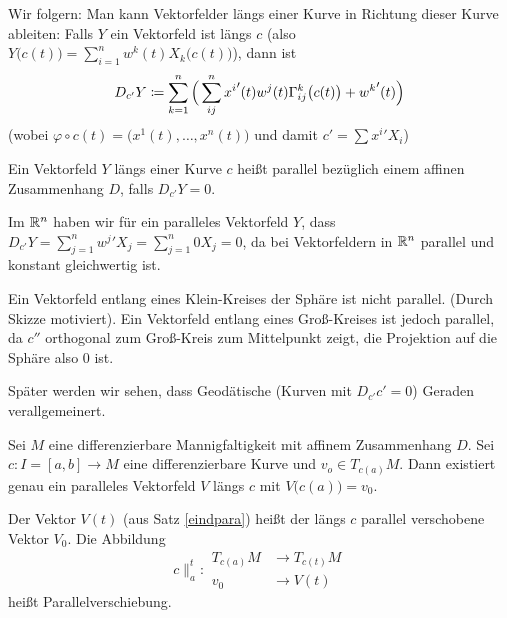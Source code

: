 \documentclass[a4paper,twoside,DIV15,BCOR12mm]{scrbook}
\begin{document}
Wir folgern: Man kann Vektorfelder längs einer Kurve in Richtung dieser Kurve ableiten: Falls $Y$ ein Vektorfeld ist längs $c$ (also $Y\big(c(t)\big) = \sum_{i=1}^n w^k(t)X_k\big(c(t)\big)$), dann ist
\[
D_{c'}Y \da \sum_{k=1}^n\Big(\sum_{ij}^n {x^i}'(t) w^j(t) \Gamma_{ij}^k\big(c(t)\big) + {w^k}'(t)\Big)
\]
(wobei $\varphi \circ c(t) = \big(x^1(t),\ldots, x^n(t)\big)$ und damit $c' = \sum {x^i}'X_i$)

\begin{definition}
Ein Vektorfeld $Y$ längs einer Kurve $c$ heißt parallel bezüglich einem affinen Zusammenhang $D$, falls $D_{c'}Y = 0$.
\end{definition}

\begin{beispiele}
\item Im $\mathbb{R}^n$ haben wir für ein paralleles Vektorfeld $Y$, dass $D_{c'}Y = \sum_{j=1}^n {w^j}'X_j = \sum_{j=1}^n 0 X_j= 0$, da bei Vektorfeldern in $\mathbb{R}^n$ parallel und konstant gleichwertig ist.
\item Ein Vektorfeld entlang eines Klein-Kreises der Sphäre ist nicht parallel. (Durch Skizze motiviert). Ein Vektorfeld entlang eines Groß-Kreises ist jedoch parallel, da $c''$ orthogonal zum Groß-Kreis zum Mittelpunkt zeigt, die Projektion auf die Sphäre also 0 ist.
\end{beispiele}

Später werden wir sehen, dass Geodätische (Kurven mit $D_{c'}c' = 0$) Geraden verallgemeinert.

\begin{satz}
\label{eindpara}
Sei $M$ eine differenzierbare Mannigfaltigkeit mit affinem Zusammenhang $D$. Sei $c: I=[a,b] \to M$ eine differenzierbare Kurve und $v_o \in T_{c(a)}M$. Dann existiert genau ein paralleles Vektorfeld $V$ längs $c$ mit $V\big(c(a)\big)= v_0$.
\end{satz}

\begin{definition}
Der Vektor $V(t)$ (aus Satz \ref{eindpara}) heißt der längs $c$ parallel verschobene Vektor $V_0$. Die Abbildung
\[
c\|_a^t: 
\begin{aligned}
T_{c(a)}M &\to T_{c(t)}M \\
v_0&\to V(t)
\end{aligned}
\]
heißt Parallelverschiebung.
\end{definition}
\end{document}
